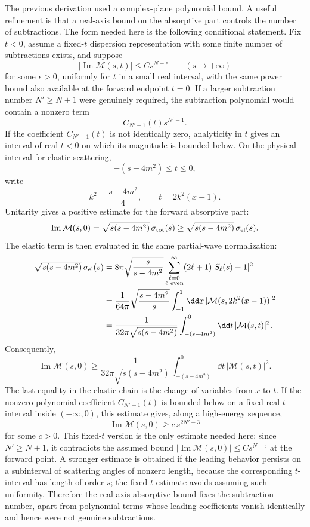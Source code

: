 The previous derivation used a complex-plane polynomial bound.  A useful
refinement is that a real-axis bound on the absorptive part controls the
number of subtractions.  The form needed here is the following conditional
statement.  Fix \(t<0\), assume a fixed-\(t\) dispersion representation with
some finite number of subtractions exists, and suppose
\[
  |\operatorname{Im}\mathcal M(s,t)|\le C s^{N-\epsilon}
  \qquad(s\to+\infty)
\]
for some \(\epsilon>0\), uniformly for \(t\) in a small real interval, with
the same power bound also available at the forward endpoint \(t=0\).  If a
larger subtraction number \(N'\ge N+1\) were genuinely required, the
subtraction polynomial would contain a nonzero term
\[
  C_{N'-1}(t)s^{N'-1}.
\]
If the coefficient \(C_{N'-1}(t)\) is not identically zero, analyticity in
\(t\) gives an interval of real \(t<0\) on which its magnitude is bounded
below.  On the physical interval for elastic scattering,
\[
  -(s-4m^2)\le t\le0,
\]
write
\[
  k^2=\frac{s-4m^2}{4},
  \qquad
  t=2k^2(x-1).
\]
Unitarity gives a positive estimate for the forward absorptive part:
\[
  \operatorname{Im}\mathcal M(s,0)
  =
  \sqrt{s(s-4m^2)}\,\sigma_{\rm tot}(s)
  \ge
  \sqrt{s(s-4m^2)}\,\sigma_{\rm el}(s).
\]
The elastic term is then evaluated in the same partial-wave normalization:
\[
\begin{aligned}
  \sqrt{s(s-4m^2)}\,\sigma_{\rm el}(s)
  &=
  8\pi\sqrt{\frac{s}{s-4m^2}}
  \sum_{\substack{\ell=0\\ \ell\ {\rm even}}}^{\infty}
  (2\ell+1)|S_\ell(s)-1|^2
\\
  &=
  \frac{1}{64\pi}\sqrt{\frac{s-4m^2}{s}}
  \int_{-1}^{1}\dd x\,
  |\mathcal M(s,2k^2(x-1))|^2
\\
  &=
  \frac{1}{32\pi\sqrt{s(s-4m^2)}}
  \int_{-(s-4m^2)}^0
  \dd t\,|\mathcal M(s,t)|^2 .
\end{aligned}
\]
Consequently,
\[
  \operatorname{Im}\mathcal M(s,0)
  \ge
  \frac{1}{32\pi\sqrt{s(s-4m^2)}}
  \int_{-(s-4m^2)}^0
  \dd t\,|\mathcal M(s,t)|^2 .
\]
The last equality in the elastic chain is the change of variables from
\(x\) to \(t\).  If the
nonzero polynomial coefficient \(C_{N'-1}(t)\) is bounded below on a fixed
real \(t\)-interval inside \((-\infty,0)\), this estimate gives, along a
high-energy sequence,
\[
  \operatorname{Im}\mathcal M(s,0)
  \ge c\,s^{2N'-3}
\]
for some \(c>0\).  This fixed-\(t\) version is the only estimate needed here:
since \(N'\ge N+1\), it contradicts the assumed bound
\(|\operatorname{Im}\mathcal M(s,0)|\le C s^{N-\epsilon}\) at the forward
point.  A stronger estimate is obtained if the leading behavior persists on a
subinterval of scattering angles of nonzero length, because the corresponding
\(t\)-interval has length of order \(s\); the fixed-\(t\) estimate avoids
assuming such uniformity.  Therefore the real-axis absorptive bound fixes the
subtraction number, apart from polynomial terms whose leading coefficients
vanish identically and hence were not genuine subtractions.

